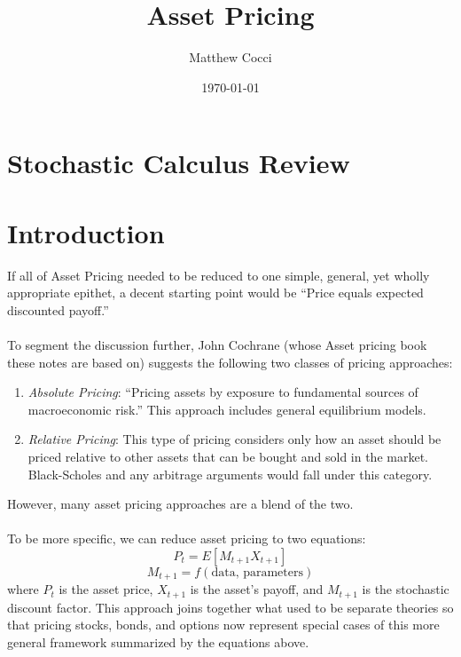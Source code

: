 \documentclass[a4paper,12pt]{scrartcl}
\author{Matthew Cocci}
\title{Asset Pricing}
\date{\today}
\begin{document}
\maketitle

\tableofcontents

\newpage
\section{Stochastic Calculus Review}

\newpage
\section{Introduction}

If all of Asset Pricing needed to be reduced to one simple,
general, yet wholly appropriate epithet, a decent starting
point would be ``Price equals expected discounted payoff.''
\\
\\
To segment the discussion further, John Cochrane (whose Asset pricing book
these notes are based on) suggests the following two classes of pricing
approaches:
\begin{enumerate}
    \item {\sl Absolute Pricing}: ``Pricing assets by exposure
	to fundamental sources of macroeconomic risk.'' This
	approach includes general equilibrium models.
    \item {\sl Relative Pricing}: This type of pricing considers
	only how an asset should be priced relative to
	other assets that can be bought and sold in the
	market. Black-Scholes and any arbitrage arguments
	would fall under this category.
\end{enumerate}
However, many asset pricing approaches are a blend of the two.
\\
\\
To be more specific, we can reduce asset pricing to two
equations:
\begin{equation}
    P_t = E[M_{t+1} X_{t+1} ]
\end{equation}
\begin{equation}
    M_{t+1} = f(\text{data, parameters})
\end{equation}
where $P_t$ is the asset price, $X_{t+1}$ is the asset's payoff,
and $M_{t+1}$ is the stochastic discount factor.
This approach joins together what used to be separate theories so
that pricing stocks, bonds, and options now represent special
cases of this more general framework summarized by the equations above.
\end{document}
